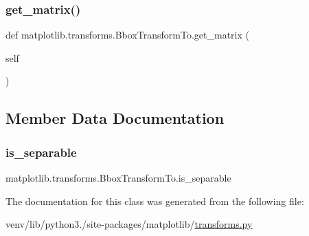 \subsubsection{\texorpdfstring{get\+\_\+matrix()}{get\_matrix()}}
{\footnotesize\ttfamily def matplotlib.\+transforms.\+Bbox\+Transform\+To.\+get\+\_\+matrix (\begin{DoxyParamCaption}\item[{}]{self }\end{DoxyParamCaption})}



\subsection{Member Data Documentation}
\mbox{\label{classmatplotlib_1_1transforms_1_1BboxTransformTo_aa5ac9aa12bc4bf73f054f9d5d5b8c7d1}} 
\subsubsection{\texorpdfstring{is\+\_\+separable}{is\_separable}}
{\footnotesize\ttfamily matplotlib.\+transforms.\+Bbox\+Transform\+To.\+is\+\_\+separable\hspace{0.3cm}{\ttfamily [static]}}



The documentation for this class was generated from the following file\+:\begin{DoxyCompactItemize}
\item 
venv/lib/python3./site-\/packages/matplotlib/\hyperlink{transforms_8py}{transforms.\+py}\end{DoxyCompactItemize}
